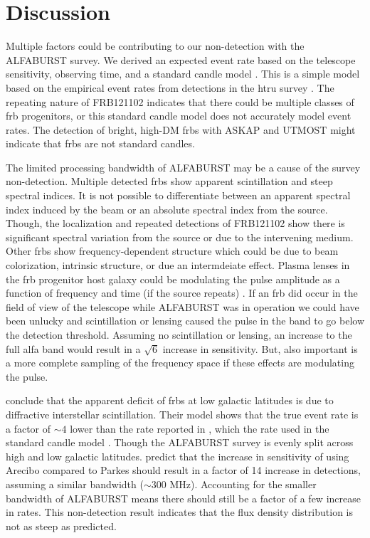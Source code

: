 \documentclass[a4paper,fleqn,usenatbib]{mnras}
\begin{document}
\section{Discussion}
\label{sec:discuss}

Multiple factors could be contributing to our non-detection with the ALFABURST
survey. We derived an expected event rate based on the telescope sensitivity,
observing time, and a standard candle model \citep{2013MNRAS.436L...5L}. This is
a simple model based on the empirical event rates from detections in the
\gls{htru} survey \citep{2013Sci...341...53T}.  The repeating nature of
FRB121102 indicates that there could be multiple classes of \gls{frb}
progenitors, or this standard candle model does not accurately model event
rates. The detection of bright, high-DM \glspl{frb} with ASKAP
\citep{2017ApJ...841L..12B} and UTMOST \citep{2017MNRAS.468.3746C,atel10697}
might indicate that \glspl{frb} are not standard candles.

The limited processing bandwidth of ALFABURST may be a cause of the survey
non-detection. Multiple detected \glspl{frb} show apparent scintillation and
steep spectral indices.  It is not possible to differentiate between an apparent
spectral index induced by the beam or an absolute spectral index from the
source.  Though, the localization and repeated detections of FRB121102 show
there is significant spectral variation from the source or due to the
intervening medium.  Other \glspl{frb} show frequency-dependent structure which
could be due to beam colorization, intrinsic structure, or due an intermdeiate
effect.  Plasma lenses in the \gls{frb} progenitor host galaxy could be
modulating the pulse amplitude as a function of frequency and time (if the
source repeats) \citep{2017ApJ...842...35C}.  If an \gls{frb} did occur in the
field of view of the telescope while ALFABURST was in operation we could have
been unlucky and scintillation or lensing caused the pulse in the band to go
below the detection threshold.  Assuming no scintillation or lensing, an
increase to the full \gls{alfa} band would result in a $\sqrt{6}$ increase in
sensitivity. But, also important is a more complete sampling of the frequency
space if these effects are modulating the pulse.

\cite{2015MNRAS.451.3278M} conclude that the apparent deficit of \glspl{frb} at
low galactic latitudes is due to diffractive interstellar scintillation. Their
model shows that the true event rate is a factor of $\sim 4$ lower than the rate
reported in \cite{2013Sci...341...53T}, which the rate used in the standard
candle model \citep{2013MNRAS.436L...5L}. Though the ALFABURST survey is evenly
split across high and low galactic latitudes.  \cite{2015MNRAS.451.3278M} predict
that the increase in sensitivity of using Arecibo compared to Parkes should
result in a factor of 14 increase in detections, assuming a similar bandwidth
($\sim 300$ MHz). Accounting for the smaller bandwidth of ALFABURST means there
should still be a factor of a few increase in rates. This non-detection result
indicates that the \cite{2015MNRAS.451.3278M} flux density distribution is not
as steep as predicted.
\end{document}
